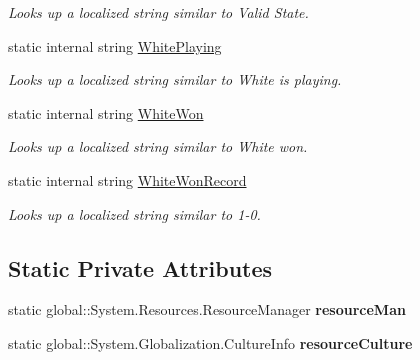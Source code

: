 \begin{DoxyCompactItemize}
\begin{DoxyCompactList}\small\item\em Looks up a localized string similar to Valid State. \end{DoxyCompactList}\item 
static internal string \mbox{\hyperlink{class_chess_tracking_1_1_localization_1_1_program_localization_aa036c5d7b9519a4478b31ff6ed25c455}{White\+Playing}}
\begin{DoxyCompactList}\small\item\em Looks up a localized string similar to White is playing. \end{DoxyCompactList}\item 
static internal string \mbox{\hyperlink{class_chess_tracking_1_1_localization_1_1_program_localization_abe73133baf0f6f5265eb76ff37c27d21}{White\+Won}}
\begin{DoxyCompactList}\small\item\em Looks up a localized string similar to White won. \end{DoxyCompactList}\item 
static internal string \mbox{\hyperlink{class_chess_tracking_1_1_localization_1_1_program_localization_a014d45165c10308a9620e1006f8c84a0}{White\+Won\+Record}}
\begin{DoxyCompactList}\small\item\em Looks up a localized string similar to 1-\/0. \end{DoxyCompactList}\end{DoxyCompactItemize}
\subsection*{Static Private Attributes}
\begin{DoxyCompactItemize}
\item 
\mbox{\label{class_chess_tracking_1_1_localization_1_1_program_localization_a9348b34e60d856b3cacdd7dc8e0716fd}} 
static global\+::\+System.\+Resources.\+Resource\+Manager {\bfseries resource\+Man}
\item 
\mbox{\label{class_chess_tracking_1_1_localization_1_1_program_localization_a22fc4985341c196d484894a655163bdb}} 
static global\+::\+System.\+Globalization.\+Culture\+Info {\bfseries resource\+Culture}
\end{DoxyCompactItemize}


